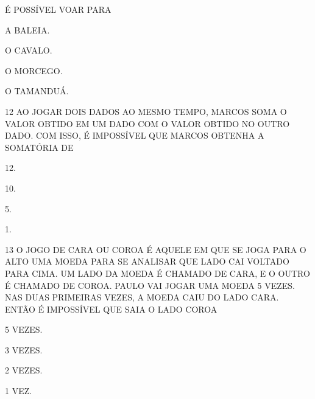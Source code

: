 É POSSÍVEL VOAR PARA

\begin{escolha}
\item A BALEIA.

\item O CAVALO.

\item O MORCEGO.

\item O TAMANDUÁ.
\end{escolha}


\num{12} AO JOGAR DOIS DADOS AO MESMO TEMPO, MARCOS SOMA O VALOR OBTIDO EM UM DADO COM O VALOR OBTIDO NO OUTRO DADO.
COM ISSO, É IMPOSSÍVEL QUE MARCOS OBTENHA A SOMATÓRIA DE

\begin{escolha}
\item 12.

\item 10.

\item 5.

\item 1.
\end{escolha}




\num{13} O JOGO DE CARA OU COROA É AQUELE EM QUE SE JOGA PARA O ALTO UMA MOEDA
PARA SE ANALISAR QUE LADO CAI VOLTADO PARA CIMA. UM LADO DA MOEDA É CHAMADO DE
CARA, E O OUTRO É CHAMADO DE COROA. PAULO VAI JOGAR UMA MOEDA 5 VEZES. NAS DUAS
PRIMEIRAS VEZES, A MOEDA CAIU DO LADO CARA. ENTÃO É IMPOSSÍVEL QUE SAIA O LADO
COROA

\begin{escolha}
\item 5 VEZES.

\item 3 VEZES.

\item 2 VEZES.

\item 1 VEZ.
\end{escolha}

